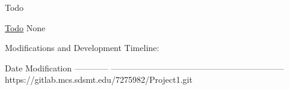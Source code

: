 \begin{DoxyRefDesc}{Todo}
\item[\hyperlink{todo__todo000001}{Todo}]None\end{DoxyRefDesc}


\begin{DoxyParagraph}{Modifications and Development Timeline\-:}
\begin{DoxyVerb}Date          Modification
------------  --------------------------------------------------------------
https://gitlab.mcs.sdsmt.edu/7275982/Project1.git
\end{DoxyVerb}
 
\end{DoxyParagraph}
